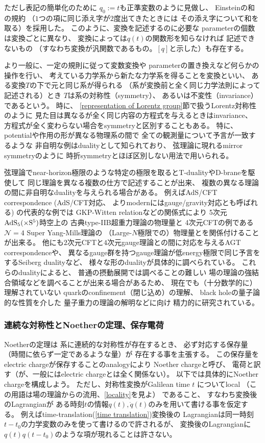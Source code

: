 ただし表記の簡単化のために
$q_0 := t$も正準変数のように見做し、
Einsteinの和の規約
（$1$つの項に同じ添え字が$2$度出てきたときには
その添え字について和を取る）を採用した。
このように、変換を記述するのに必要な
parameterの個数は変換ごとに異なり、
変換によっては$q(t)$の関数形を知らなければ
記述できないもの
（すなわち変換が汎関数であるもの。$[q]$と示した）も存在する。

より一般に、一定の規則に従って変数変換や
parameterの置き換えなど何らかの操作を行い、
考えている力学系から新たな力学系を得ることを変換といい、
ある変換$T$の下で元と同じ系が得られる
（系が変換前と全く同じ力学法則によって記述される）とき
$T$は系の対称性（symmetry）、
あるいは不変性（invariance）であるという。
時に、
\ref{representation of Lorentz group}節で扱うLorentz対称性のように
見た目は異なるが全く同じ内容の方程式を与えるときはinvariance、
方程式が全く変わらない場合をsymmetryと区別することもある。
特に、potentialや作用の形が異なる物理系の間で
全ての観測量について予言が一致するような
非自明な例はdualityとして知られており、
弦理論に現れるmirror symmetryのように
時折symmetryとほぼ区別しない用法で用いられる。

弦理論でnear-horizon極限のような特定の極限を取るとT-dualityやD-braneを駆使して
同じ理論を異なる複数の仕方で記述することが出来、
複数の異なる理論の間に非自明なdualityを与えられる場合がある。
例えばAdS/CFT correspondence
(AdS/CFT対応、
よりmodernにはgauge/gravity対応とも呼ばれる)
の代表的な例では
GKP-Witten relationなどの関係式により
5次元$\rm{AdS}_5(\times S^5)$時空上の
古典type-IIB超重力理論の物理量と
4次元CFTの例である$\mathcal{N}=4$ Super Yang-Mills理論の
（Large-$N$極限での）物理量とを関係付けることが出来る。
他にも$2$次元CFTと$4$次元gauge理論との間に対応を与えるAGT correspondenceや、
異なるgauge群を持つgauge理論が低energy極限で同じ予言をするSeiberg dualityなど、
様々な形のdualityが具体的に調べられている。
これらのdualityによると、
普通の摂動展開では調べることの難しい
場の理論の強結合領域などを調べることが出来る場合があるため、
現在でも（十分数学的に）理解されていない
quarkのconfinement（閉じ込め）の理解、
black holeの量子論的な性質を介した
量子重力の理論の解明などに向け
精力的に研究されている。

\subsubsection{連続な対称性とNoetherの定理、保存電荷}

Noetherの定理は
系に連続的な対称性が存在するとき、
必ず対応する保存量（時間に依らず一定であるような量）が
存在する事を主張する。
この保存量をelectric chargeが保存することのanalogyにより
Noether chargeと呼び、
電荷と訳す（が、一般にはelectric chargeとは全く関係ない）。
以下では具体的にNoether chargeを構成しよう。
ただし、対称性変換がGalilean time $t$
についてlocal
（この用語は場の理論からの流用、\ref{locality}を見よ）
であること、
すなわち変換後のLagrangianが
ある時刻$t$の情報$q(t), \dot{q}(t)$のみを用いて書ける事を仮定する。
例えばtime-translation(\ref{time translation})変換後の
Lagrangianは同一時刻$t - t_0$の力学変数のみを使って書けるので許されるが、
変換後のLagrangianに
$q(t)q(t-t_0)$のような項が現れることは許さない。


